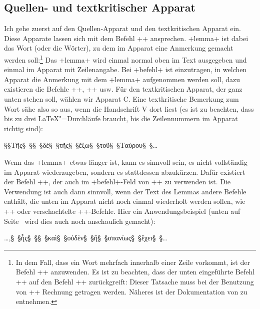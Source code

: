 \subsection{Quellen- und textkritischer Apparat}

Ich gehe zuerst auf den Quellen-Apparat und den textkritischen Apparat ein. Diese Apparate lassen sich 
mit dem Befehl ++ ansprechen. +lemma+ ist dabei das Wort (oder die Wörter), 
zu dem im Apparat eine Anmerkung gemacht werden soll:\footnote{In dem Fall, dass ein Wort mehrfach 
innerhalb einer Zeile vorkommt, ist der Befehl ++ anzuwenden. Es ist zu beachten, dass 
der unten eingeführte Befehl +\vari+ auf den Befehl +\lemma+ zurückgreift: Dieser Tatsache muss 
bei der Benutzung von +\sameword+ Rechnung getragen werden. Näheres ist der Dokumentation von 
\reledmac zu entnehmen.} Das +lemma+ wird einmal normal oben im Text ausgegeben und einmal im Apparat mit Zeilenangabe. Bei +befehl+ ist einzutragen, 
in welchen Apparat die Anmerkung mit 
dem +lemma+ aufgenommen werden soll, 
dazu existieren die Befehle ++, ++ usw. Für den textkritischen Apparat, der ganz unten stehen soll, wählen wir Apparat C. Eine textkritische Bemerkung zum Wort  sähe also so aus, wenn die Handschrift V dort  liest 
(es ist zu beachten, dass \reledmac bis zu drei \LaTeX"=Durchläufe braucht, bis die Zeilennummern im Apparat richtig sind):

\begin{lfgwcode}{}
§\null§Τῆς§~§§~§δὲ§~§τῆς§~§ἔξω§~§τοῦ§~§Ταύρου§~§\dots{}
\end{lfgwcode}

Wenn das +lemma+ etwas länger ist, kann es sinnvoll sein, es nicht vollständig im Apparat wiederzugeben, sondern es
stattdessen abzukürzen. 
Dafür existiert der Befehl ++, der auch im +befehl+-Feld von +\edtext+ zu verwenden ist.
Die Verwendung ist auch dann sinnvoll, wenn der Text des Lemmas andere Befehle enthält, die unten im Apparat nicht noch einmal wiederholt werden sollen, wie +\alteSeite+ oder verschachtelte +\edtext+-Befehle.
Hier ein Anwendungsbeispiel (unten auf Seite~\pageref{Pilhofer-Beispiel-Lemma-kurz} wird dies auch noch anschaulich gemacht):

\begin{lfgwcode}{}
\dots{},§~§ἧς§~§§~§καὶ§~§οὐδὲν§~§ἢ§~§σπανίως§~§ἔχει§~§\dots{}
\end{lfgwcode}

